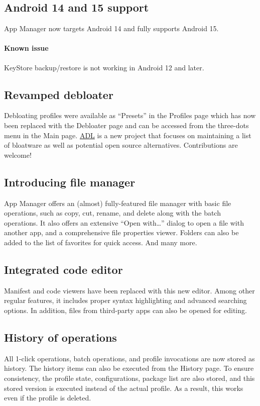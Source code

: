 \subsection{Android 14 and 15 support}
App Manager now targets Android 14 and fully supports Android 15.

\paragraph{Known issue} KeyStore backup/restore is not working in Android 12 and later.

\subsection{Revamped debloater}
Debloating profiles were available as ``Presets'' in the Profiles page which has now been replaced
with the Debloater page and can be accessed from the three-dots menu in the Main page.
\href{https://github.com/MuntashirAkon/android-debloat-list}{ADL} is a new project that focuses on
maintaining a list of bloatware as well as potential open source alternatives. Contributions are
welcome!

\subsection{Introducing file manager}
App Manager offers an (almost) fully-featured file manager with basic file operations, such as copy,
cut, rename, and delete along with the batch operations. It also offers an extensive ``Open with\dots''
dialog to open a file with another app, and a comprehensive file properties viewer. Folders can also
be added to the list of favorites for quick access. And many more.

\subsection{Integrated code editor}
Manifest and code viewers have been replaced with this new editor. Among other regular features, it
includes proper syntax highlighting and advanced searching options. In addition, files from
third-party apps can also be opened for editing.

\subsection{History of operations}
All 1-click operations, batch operations, and profile invocations are now stored as history. The
history items can also be executed from the History page. To ensure consistency, the profile state,
configurations, package list are also stored, and this stored version is executed instead of the
actual profile. As a result, this works even if the profile is deleted.

